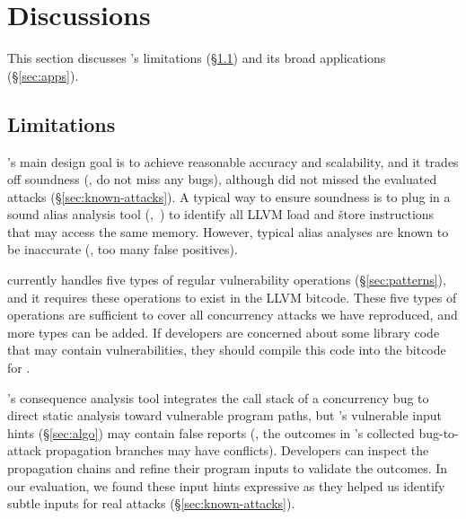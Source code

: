 \section{Discussions}\label{sec:discuss}

This section discusses \xxx's limitations (\S\ref{sec:limits}) and its broad 
applications (\S\ref{sec:apps}).

\subsection{Limitations}\label{sec:limits}

\xxx's main design goal is to achieve reasonable accuracy and scalability, 
and it trades off soundness (\ie, do not miss any bugs), although \xxx did not 
missed the evaluated attacks (\S\ref{sec:known-attacks}). A typical way to 
ensure soundness is to plug in a sound alias analysis tool (\eg,~\cite{bddbddb, 
dsa:pldi07}) to identify all LLVM \v{load} and \v{store} instructions that may 
access the same memory. However, typical alias analyses are known to be 
inaccurate (\eg, too many false positives).

\xxx currently handles five types of regular vulnerability operations 
(\S\ref{sec:patterns}), and it requires these operations to exist in the LLVM 
bitcode. These five types of operations are sufficient to cover all 
\nreproduced concurrency attacks we have reproduced, and more types can be 
added. If developers are concerned about some library code that may contain 
vulnerabilities, they should compile this code into the bitcode for \xxx.

\xxx's consequence analysis tool integrates the call stack of a concurrency bug to 
direct static analysis toward vulnerable program paths, but \xxx's vulnerable 
input hints (\S\ref{sec:algo}) may contain false reports (\eg, the outcomes 
in \xxx's collected bug-to-attack propagation branches may have conflicts). 
Developers can inspect the propagation chains and refine their program inputs to 
validate the outcomes. In our evaluation, we found these input hints expressive 
as they helped us identify subtle inputs for real 
attacks (\S\ref{sec:known-attacks}).




